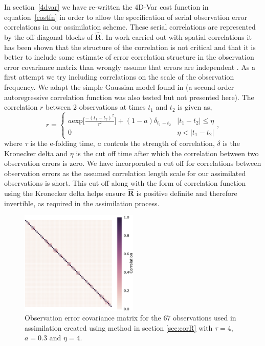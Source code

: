 \documentclass[11pt]{article}
\begin{document}
In section~\ref{4dvar} we have re-written the 4D-Var cost function in equation~\ref{costfn} in order to allow the specification of serial observation error correlations in our assimilation scheme. These serial correlations are represented by the off-diagonal blocks of $\hat{\mathbf{R}}$. In work carried out with spatial correlations it has been shown that the structure of the correlation is not critical \citep{Healy2005} and that it is better to include some estimate of error correlation structure in the observation error covariance matrix than wrongly assume that errors are independent \citep{Stewart2013}. As a first attempt we try including correlations on the scale of the observation frequency. We adapt the simple Gaussian model found in \citet{jarvinen1999variational} (a second order autoregressive correlation function was also tested but not presented here). The correlation $r$ between 2 observations at times $t_1$ and $t_2$ is given as,
\begin{equation}
r =
\begin{cases} 
      a \text{exp} \bigg[ \frac{-(t_1 - t_2)^2}{\tau^2} \bigg] + (1- a)\delta_{t_1 - t_2} & |t_1 - t_2| \leq \eta \\
      0 & \eta < |t_1 - t_2| 
   \end{cases}
   , \label{eqn:corr_fn}
\end{equation}
where $\tau$ is the e-folding time, $a$ controls the strength of correlation, $\delta$ is the Kronecker delta and $\eta$ is the cut off time after which the correlation between two observation errors is zero. We have incorporated a cut off for correlations between observation errors as the assumed correlation length scale for our assimilated observations is short. This cut off along with the form of correlation function using the Kronecker delta helps ensure $\hat{\mathbf{R}}$ is positive definite and therefore invertible, as required in the assimilation process. 

\begin{figure}[ht]
    \centering
    \includegraphics[width=0.5\textwidth]{rcorcor.eps}
    \caption{Observation error covariance matrix for the 67 observations used in assimilation created using method in section \ref{sec:corR} with $\tau = 4$, $a=0.3$ and $\eta=4$.}
    \label{fig:Rcorr}
\end{figure}
\end{document}

